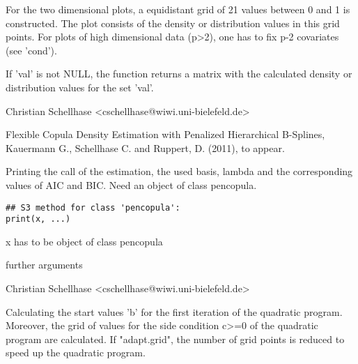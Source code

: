\documentclass[a4paper]{book}
\begin{document}
%
\begin{Details}\relax
For the two dimensional plots, a equidistant grid of 21 values between
0 and 1 is constructed. The plot consists of the density or
distribution values in this grid points. For plots of high dimensional
data (p>2), one has to fix p-2 covariates (see 'cond').
\end{Details}
%
\begin{Value}
If 'val' is not NULL, the function returns a matrix with the
calculated density or distribution values for the set 'val'.
\end{Value}
%
\begin{Author}\relax
Christian Schellhase <cschellhase@wiwi.uni-bielefeld.de>
\end{Author}
%
\begin{References}\relax
Flexible Copula Density Estimation with Penalized
Hierarchical B-Splines, Kauermann G., Schellhase C. and Ruppert, D. (2011), to appear.
\end{References}
%
\begin{Description}\relax
Printing the call of the estimation, the used basis, lambda and
the corresponding values of AIC and BIC. Need an object of class pencopula.
\end{Description}
%
\begin{Usage}
\begin{verbatim}
## S3 method for class 'pencopula':
print(x, ...)
\end{verbatim}
\end{Usage}
%
\begin{Arguments}
\begin{ldescription}
\item[\code{x}] x has to be object of class pencopula
\item[\code{...}] further arguments
\end{ldescription}
\end{Arguments}
%
\begin{Author}\relax
Christian Schellhase <cschellhase@wiwi.uni-bielefeld.de>
\end{Author}
%
\begin{Description}\relax
Calculating the start values 'b' for the first iteration of the
quadratic program. Moreover, the grid of values for the side condition
c>=0 of the quadratic program are calculated. If "adapt.grid", the
number of grid points is reduced to speed up the quadratic program.
\end{Description}
\end{document}
